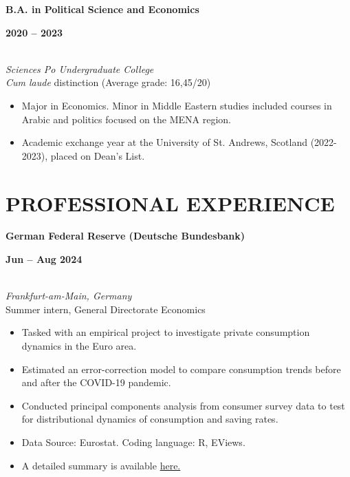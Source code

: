 \documentclass[a4paper,9pt]{extarticle}
\begin{document}
\noindent
\begin{minipage}[t]{0.7\textwidth}
  \textbf{B.A. in Political Science and Economics}
\end{minipage}%
\begin{minipage}[t]{0.3\textwidth}
  \raggedleft \textbf{2020 -- 2023}
\end{minipage}
\\
\textit{Sciences Po Undergraduate College} \\
\textit{Cum laude} distinction (Average grade: 16,45/20)
\begin{itemize}[noitemsep, topsep=0pt, left=0.65cm]
    \item Major in Economics. Minor in Middle Eastern studies included courses in Arabic and politics focused on the MENA region. 
    \item Academic exchange year at the University of St. Andrews, Scotland (2022-2023), placed on Dean's List. \\
\end{itemize} 


\section*{PROFESSIONAL EXPERIENCE}

\noindent
\newline
\begin{minipage}[t]{0.7\textwidth}
  \textbf{German Federal Reserve (Deutsche Bundesbank)}
\end{minipage}%
\begin{minipage}[t]{0.3\textwidth}
  \raggedleft \textbf{Jun -- Aug 2024}
\end{minipage}
\\
\textit{Frankfurt-am-Main, Germany} \\ 
Summer intern, General Directorate Economics 
\begin{itemize}[noitemsep, topsep=0pt, left=0.65cm]
    \item Tasked with an empirical project to investigate private consumption dynamics in the Euro area.
    \item Estimated an error-correction model to compare consumption trends before and after the COVID-19 pandemic.
    \item Conducted principal components analysis from consumer survey data to test for distributional dynamics of consumption and saving rates.
    \item Data Source: Eurostat. Coding language: R, EViews.
    \item A detailed summary is available \href{https://lionelchambon.github.io/files/Chambon_BundesbankProject_EN.pdf}{here.}
    \\
\end{itemize}
\end{document}
